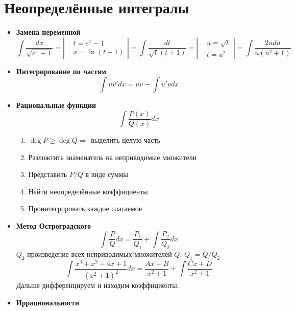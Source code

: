 \documentclass{article}
\begin{document}
\section{\color{RedViolet}\textbf{Неопределённые интегралы}}
\begin{itemize}
    \item \textbf{Замена переменной}
          \begin{equation*}
              \int\frac{dx}{\sqrt{e^x+1}} = \left|
              \begin{aligned}
                   & t = e^x-1    \\
                   & x = \ln(t+1)
              \end{aligned} \right| = \int\frac{dt}{\sqrt{t}(t+1)} = \left|
              \begin{aligned}
                   & u = \sqrt{t} \\
                   & t = u^2
              \end{aligned} \right| = \int\frac{2udu}{u(u^2+1)}
          \end{equation*}
    \item \textbf{Интегрирование по частям}
          \begin{equation*}
              \int u v'dx = uv - \int u' v dx
          \end{equation*}
    \item \textbf{Рациональные функции}
          $$\int\frac{P(x)}{Q(x)}dx $$
          \begin{enumerate}
              \item $\deg P \geq \deg Q \Rightarrow$ выделить целую часть
              \item Разложтить знаменатель на неприводимые множители
              \item Представить $P/Q$ в виде суммы
              \item Найти неопределённые коэффициенты
              \item Проинтегрировать каждое слагаемое
          \end{enumerate}
    \item \textbf{Метод Остроградского}
          $$ \int \frac{P}{Q}dx = \frac{P_1}{Q_1} + \int \frac{P_2}{Q_2}dx$$
          $Q_2$ произведение всех неприводимых множителей $Q$, $Q_1 = Q/Q_2$
          $$ \int\frac{x^3+x^2-4x+1}{(x^2+1)^2}dx = \frac{Ax + B}{x^2+1} + \int\frac{Cx + D}{x^2+1} $$
          Дальше дифференцируем и находим коэффициенты.
    \item \textbf{Иррациональности}

\end{itemize}
\end{document}
